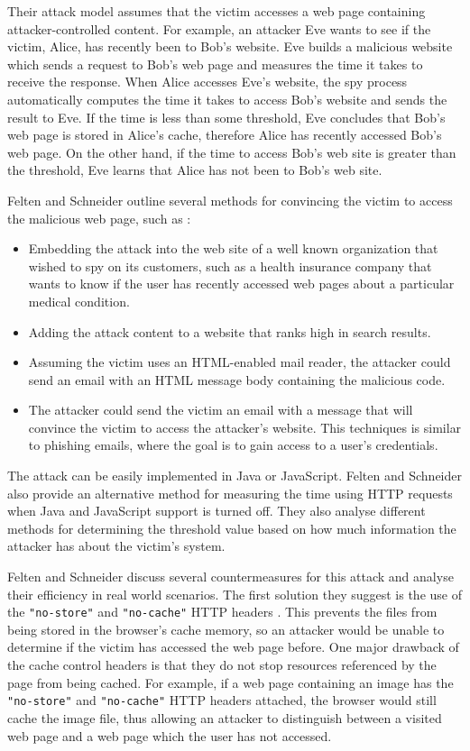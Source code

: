 \documentclass[10pt,a4paper,twoside]{book}
\begin{document}
Their attack model assumes that the victim accesses a web page containing attacker-controlled content. For example, an attacker Eve wants to see if the victim, Alice, has recently been to Bob's website. Eve builds a malicious website which sends a request to Bob's web page and measures the time it takes to receive the response. When Alice accesses Eve's website, the spy process automatically computes the time it takes to access Bob's website and sends the result to Eve. If the time is less than some threshold, Eve concludes that Bob's web page is stored in Alice's cache, therefore Alice has recently accessed Bob's web page. On the other hand, if the time to access Bob's web site is greater than the threshold, Eve learns that Alice has not been to Bob's web site.

Felten and Schneider outline several methods for convincing the victim to access the malicious web page, such as \cite{felten2000timing}:
\begin{itemize}
\item Embedding the attack into the web site of a well known organization that wished to spy on its customers, such as a health insurance company that wants to know if the user has recently accessed web pages about a particular medical condition.
\item Adding the attack content to a website that ranks high in search results. 
\item Assuming the victim uses an HTML-enabled mail reader, the attacker could send an email with an HTML message body containing the malicious code.
\item The attacker could send the victim an email with a message that will convince the victim to access the attacker's website. This techniques is similar to phishing emails, where the goal is to gain access to a user's credentials.
\end{itemize}

The attack can be easily implemented in Java or JavaScript. Felten and Schneider also provide an alternative method for measuring the time using HTTP requests when Java and JavaScript support is turned off. They also analyse different methods for determining the threshold value based on how much information the attacker has about the victim's system.

Felten and Schneider discuss several countermeasures for this attack and analyse their efficiency in real world scenarios. The first solution they suggest is the use of the \texttt{"no-store"} and \texttt{"no-cache"} HTTP headers \cite{felten2000timing}. This prevents the files from being stored in the browser's cache memory, so an attacker would be unable to determine if the victim has accessed the web page before. One major drawback of the cache control headers is that they do not stop resources referenced by the page from being cached. For example, if a web page containing an image has the \texttt{"no-store"} and \texttt{"no-cache"} HTTP headers attached, the browser would still cache the image file, thus allowing an attacker to distinguish between a visited web page and a web page which the user has not accessed.
\end{document}
